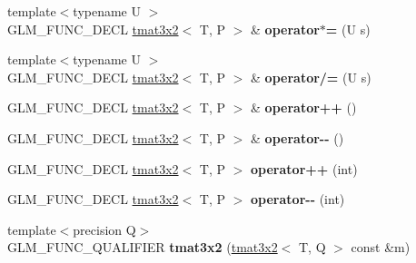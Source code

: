 \begin{DoxyCompactItemize}
\item 
{\footnotesize template$<$typename U $>$ }\\G\+L\+M\+\_\+\+F\+U\+N\+C\+\_\+\+D\+E\+CL \hyperlink{structglm_1_1detail_1_1tmat3x2}{tmat3x2}$<$ T, P $>$ \& {\bfseries operator$\ast$=} (U s)\hypertarget{structglm_1_1detail_1_1tmat3x2_a93560e047aaaafb312d67167380087cb}{}\label{structglm_1_1detail_1_1tmat3x2_a93560e047aaaafb312d67167380087cb}

\item 
{\footnotesize template$<$typename U $>$ }\\G\+L\+M\+\_\+\+F\+U\+N\+C\+\_\+\+D\+E\+CL \hyperlink{structglm_1_1detail_1_1tmat3x2}{tmat3x2}$<$ T, P $>$ \& {\bfseries operator/=} (U s)\hypertarget{structglm_1_1detail_1_1tmat3x2_a6cee280523aedb0afd6792a2712c55b4}{}\label{structglm_1_1detail_1_1tmat3x2_a6cee280523aedb0afd6792a2712c55b4}

\item 
G\+L\+M\+\_\+\+F\+U\+N\+C\+\_\+\+D\+E\+CL \hyperlink{structglm_1_1detail_1_1tmat3x2}{tmat3x2}$<$ T, P $>$ \& {\bfseries operator++} ()\hypertarget{structglm_1_1detail_1_1tmat3x2_aa739464db6e7ce980fbc84276c6647c1}{}\label{structglm_1_1detail_1_1tmat3x2_aa739464db6e7ce980fbc84276c6647c1}

\item 
G\+L\+M\+\_\+\+F\+U\+N\+C\+\_\+\+D\+E\+CL \hyperlink{structglm_1_1detail_1_1tmat3x2}{tmat3x2}$<$ T, P $>$ \& {\bfseries operator-\/-\/} ()\hypertarget{structglm_1_1detail_1_1tmat3x2_aee4f32e3b1bd8b4e9def345a530b3499}{}\label{structglm_1_1detail_1_1tmat3x2_aee4f32e3b1bd8b4e9def345a530b3499}

\item 
G\+L\+M\+\_\+\+F\+U\+N\+C\+\_\+\+D\+E\+CL \hyperlink{structglm_1_1detail_1_1tmat3x2}{tmat3x2}$<$ T, P $>$ {\bfseries operator++} (int)\hypertarget{structglm_1_1detail_1_1tmat3x2_a33e503443ab8dea023c343c0c5b9a91c}{}\label{structglm_1_1detail_1_1tmat3x2_a33e503443ab8dea023c343c0c5b9a91c}

\item 
G\+L\+M\+\_\+\+F\+U\+N\+C\+\_\+\+D\+E\+CL \hyperlink{structglm_1_1detail_1_1tmat3x2}{tmat3x2}$<$ T, P $>$ {\bfseries operator-\/-\/} (int)\hypertarget{structglm_1_1detail_1_1tmat3x2_a3547cfdefa716317277db523703debee}{}\label{structglm_1_1detail_1_1tmat3x2_a3547cfdefa716317277db523703debee}

\item 
{\footnotesize template$<$precision Q$>$ }\\G\+L\+M\+\_\+\+F\+U\+N\+C\+\_\+\+Q\+U\+A\+L\+I\+F\+I\+ER {\bfseries tmat3x2} (\hyperlink{structglm_1_1detail_1_1tmat3x2}{tmat3x2}$<$ T, Q $>$ const \&m)\hypertarget{structglm_1_1detail_1_1tmat3x2_a5b0141e3e353259aed227c013a5ae5a0}{}\label{structglm_1_1detail_1_1tmat3x2_a5b0141e3e353259aed227c013a5ae5a0}


\end{DoxyCompactItemize}
